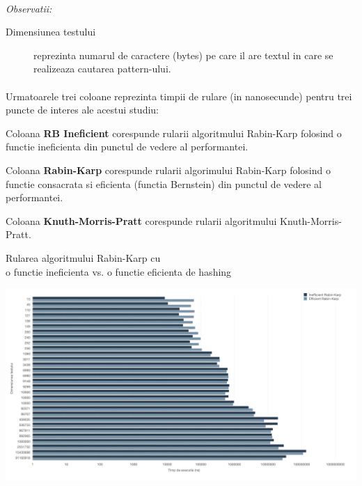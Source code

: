 \documentclass[runningheads]{llncs}
\begin{document}
\paragraph{} \textit{Observatii:} 
\begin{description}
\item [Dimensiunea testului] reprezinta numarul de caractere (bytes) pe care il are textul in care se realizeaza cautarea pattern-ului.
\end{description}
\paragraph{} Urmatoarele trei coloane reprezinta timpii de rulare (in nanosecunde) pentru trei puncte de interes ale acestui studiu:
\begin{description}
\item Coloana \textbf{RB Ineficient} corespunde rularii algoritmului Rabin-Karp folosind o functie ineficienta din punctul de vedere al performantei.
\item Coloana \textbf{Rabin-Karp} corespunde rularii algorimului Rabin-Karp folosind o functie consacrata si eficienta (functia Bernstein) din punctul de vedere al performantei.
\item Coloana \textbf{Knuth-Morris-Pratt} corespunde rularii algoritmului Knuth-Morris-Pratt. \\
\end{description}

\begin{center}
Rularea algoritmului Rabin-Karp cu\\ o functie ineficienta vs. o functie eficienta de hashing\\
\end{center}
\includegraphics[scale=0.3]{rbvsrb.png}
\end{document}

